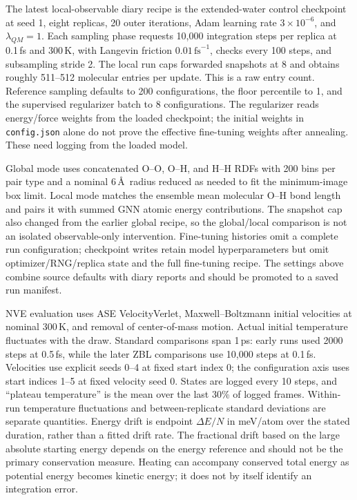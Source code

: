 \documentclass[11pt]{article}
\begin{document}
The latest local-observable diary recipe is the extended-water control
checkpoint at seed 1, eight replicas, 20 outer iterations, Adam learning
rate $3\times10^{-6}$, and $\lambda_{QM}=1$. Each sampling phase requests
10,000 integration steps per replica at 0.1\,fs and 300\,K, with Langevin
friction $0.01\,\mathrm{fs}^{-1}$, checks every 100 steps, and subsampling
stride 2. The local run caps forwarded snapshots at 8 and obtains roughly
511--512 molecular entries per update. This is a raw entry count.
Reference sampling defaults to 200 configurations, the floor percentile
to 1, and the supervised regularizer batch to 8 configurations. The
regularizer reads energy/force weights from the loaded checkpoint;
the initial weights in \texttt{config.json} alone do not prove the
effective fine-tuning weights after annealing. These need logging from
the loaded model.

Global mode uses concatenated O--O, O--H, and H--H RDFs with 200 bins
per pair type and a nominal 6\,\AA\ radius reduced as needed to fit the
minimum-image box limit. Local mode matches the ensemble mean molecular
O--H bond length and pairs it with summed GNN atomic energy contributions.
The snapshot cap also changed from the earlier global recipe, so the
global/local comparison is not an isolated observable-only intervention.
Fine-tuning histories omit a complete run configuration; checkpoint writes
retain model hyperparameters but omit optimizer/RNG/replica state and
the full fine-tuning recipe. The settings above combine source defaults
with diary reports and should be promoted to a saved run manifest.

NVE evaluation uses ASE VelocityVerlet, Maxwell--Boltzmann initial
velocities at nominal 300\,K, and removal of center-of-mass motion.
Actual initial temperature fluctuates with the draw. Standard comparisons
span 1\,ps: early runs used 2000 steps at 0.5\,fs, while the later ZBL
comparisons use 10,000 steps at 0.1\,fs. Velocities use explicit seeds
0--4 at fixed start index 0; the configuration axis uses start indices
1--5 at fixed velocity seed 0. States are logged every 10 steps, and
``plateau temperature'' is the mean over the last 30\% of logged frames.
Within-run temperature fluctuations and between-replicate standard
deviations are separate quantities. Energy drift is endpoint
$\Delta E/N$ in meV/atom over the stated duration, rather than a fitted
drift rate. The fractional drift based on the large absolute starting
energy depends on the energy reference and should not be the primary
conservation measure. Heating can accompany conserved total energy as
potential energy becomes kinetic energy; it does not by itself identify
an integration error.
\end{document}
